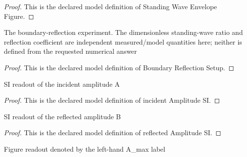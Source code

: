 \begin{proof}
  This is the declared model definition of Standing Wave Envelope Figure.
\end{proof}
\begin{definition}
  \label{def:physics:phyx-mini-0307:phyxminiproblems-problemphyxmini0307-boundaryreflectionsetup}
  The boundary-reflection experiment. The dimensionless standing-wave ratio and reflection coefficient are independent measured/model quantities here; neither is defined from the requested numerical answer
\end{definition}
\begin{proof}
  This is the declared model definition of Boundary Reflection Setup.
\end{proof}
\begin{definition}
  \label{def:physics:phyx-mini-0307:phyxminiproblems-problemphyxmini0307-incidentamplitudesi}
  SI readout of the incident amplitude A
\end{definition}
\begin{proof}
  This is the declared model definition of incident Amplitude SI.
\end{proof}
\begin{definition}
  \label{def:physics:phyx-mini-0307:phyxminiproblems-problemphyxmini0307-reflectedamplitudesi}
  SI readout of the reflected amplitude B
\end{definition}
\begin{proof}
  This is the declared model definition of reflected Amplitude SI.
\end{proof}
\begin{definition}
  \label{def:physics:phyx-mini-0307:phyxminiproblems-problemphyxmini0307-maximumenvelopeamplitudesi}
  Figure readout denoted by the left-hand A\_max label
\end{definition}
